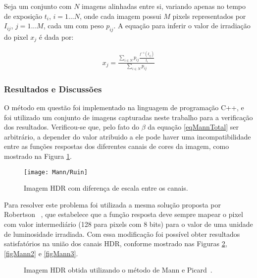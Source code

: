 Seja um conjunto com $N$ imagens alinhadas entre si, variando apenas no tempo de exposição $t_{i}$, $i = 1 ... N$, onde cada imagem possui $M$ pixels representados por $I_{ij}$, $j = 1... M$, cada um com peso $p_{ij}$. A equação para inferir o valor de irradiação do pixel $x_{j}$ é dada por:

\begin{align} \label{eqMannGeracao}
          x_{j} = \frac{\sum\limits_{i \in N}{p_{ij}\frac{f^{-1}(I_{ij})}{t_{i}}}}{\sum\limits_{i \in N}{p_{ij}}}
\end{align}

\subsubsection{Resultados e Discussões} \label{metodoMannResultado}

O método em questão foi implementado na linguagem de programação C++, e foi utilizado um conjunto de imagens capturadas neste trabalho para a verificação dos resultados. Verificou-se que, pelo fato do $\beta$ da equação \ref{eqMannTotal} ser arbitrário, a depender do valor atribuido a ele pode haver uma incompatibilidade entre as funções respostas dos diferentes canais de cores da imagem, como mostrado na Figura \ref{figMannFigErr}.

\begin{figure}[H]
  \centering
  \texttt{[image: Mann/Ruin]}
  \caption{Imagem HDR com diferença de escala entre os canais.}
  \label{figMannFigErr}
\end{figure}

Para resolver este problema foi utilizada a mesma solução proposta por Robertson \etal~\cite{robertson}, que estabelece que a função resposta deve sempre mapear o pixel com valor intermediário (128 para pixels com 8 bits) para o valor de uma unidade de luminosidade irradiada. Com essa modificação foi possível obter resultados satisfatórios na união dos canais HDR, conforme mostrado nas Figuras \ref{figMann1}, \ref{figMann2} e \ref{figMann3}.

\begin{figure}[H]
  \centering
  \quad %
  \caption{Imagem HDR obtida utilizando o método de Mann e Picard~\protect\cite{mann}.}
  \label{figMann1}
\end{figure}

